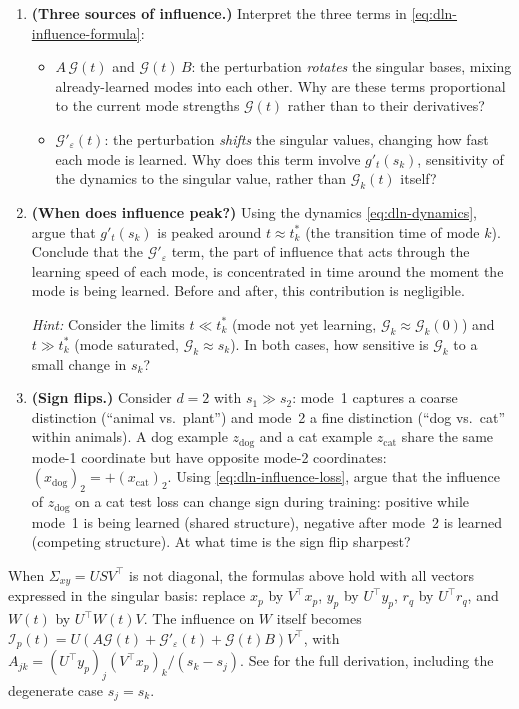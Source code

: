 \documentclass[11pt]{article}
\begin{document}
\begin{exercise}
\begin{enumerate}
  \item \textbf{(Three sources of influence.)} Interpret the three terms in \eqref{eq:dln-influence-formula}:
  \begin{itemize}
    \item $A\,\mathcal{G}(t)$ and $\mathcal{G}(t)\,B$: the perturbation \emph{rotates} the singular bases, mixing already-learned modes into each other. Why are these terms proportional to the current mode strengths $\mathcal{G}(t)$ rather than to their derivatives?
    \item $\mathcal{G}'_\varepsilon(t)$: the perturbation \emph{shifts} the singular values, changing how fast each mode is learned. Why does this term involve $g'_t(s_k)$, sensitivity of the dynamics to the singular value, rather than $\mathcal{G}_k(t)$ itself?
  \end{itemize}
  \item \textbf{(When does influence peak?)} Using the dynamics \eqref{eq:dln-dynamics}, argue that $g'_t(s_k)$ is peaked around $t \approx t_k^*$ (the transition time of mode $k$). Conclude that the $\mathcal{G}'_\varepsilon$ term, the part of influence that acts through the learning speed of each mode, is concentrated in time around the moment the mode is being learned. Before and after, this contribution is negligible.

  \emph{Hint:} Consider the limits $t \ll t_k^*$ (mode not yet learning, $\mathcal{G}_k \approx \mathcal{G}_k(0)$) and $t \gg t_k^*$ (mode saturated, $\mathcal{G}_k \approx s_k$). In both cases, how sensitive is $\mathcal{G}_k$ to a small change in $s_k$?
  \item \textbf{(Sign flips.)} Consider $d = 2$ with $s_1 \gg s_2$: mode~1 captures a coarse distinction (``animal vs.\ plant'') and mode~2 a fine distinction (``dog vs.\ cat'' within animals). A dog example $z_{\mathrm{dog}}$ and a cat example $z_{\mathrm{cat}}$ share the same mode-1 coordinate but have opposite mode-2 coordinates: $(x_{\mathrm{dog}})_2 = +(x_{\mathrm{cat}})_2$. Using \eqref{eq:dln-influence-loss}, argue that the influence of $z_{\mathrm{dog}}$ on a cat test loss can change sign during training: positive while mode~1 is being learned (shared structure), negative after mode~2 is learned (competing structure). At what time is the sign flip sharpest?
\end{enumerate}
\end{exercise}

\begin{remark}\label{rem:dln-general}
When $\Sigma_{xy} = USV^\top$ is not diagonal, the formulas above hold with all vectors expressed in the singular basis: replace $x_p$ by $V^\top x_p$, $y_p$ by $U^\top y_p$, $r_q$ by $U^\top r_q$, and $W(t)$ by $U^\top W(t) V$. The influence on $W$ itself becomes $\mathcal{I}_p(t) = U(A\mathcal{G}(t) + \mathcal{G}'_\varepsilon(t) + \mathcal{G}(t)B)V^\top$, with $A_{jk} = (U^\top y_p)_j(V^\top x_p)_k/(s_k - s_j)$. See \citet{lee2025stagewise} for the full derivation, including the degenerate case $s_j = s_k$.
\end{remark}
\end{document}
